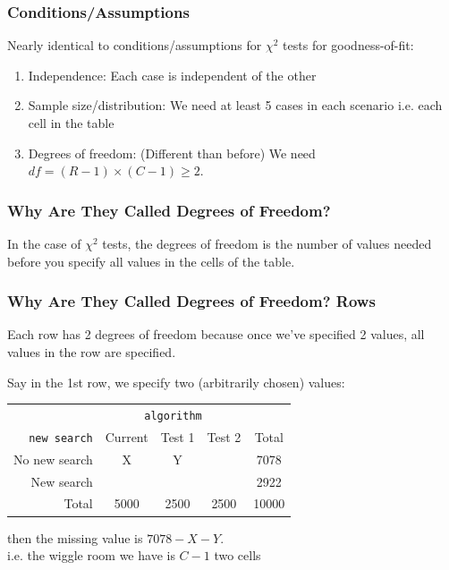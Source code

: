 \documentclass[slides]{beamer}
\newcommand{\blue}[1]{\textcolor{blue2}{#1}}
\begin{document}
\begin{frame}
\frametitle{Conditions/Assumptions}
Nearly identical to conditions/assumptions for $\chi^2$ tests for goodness-of-fit:
\begin{enumerate}
\pause\item \blue{Independence}:  Each case is independent of the other
\pause\item \blue{Sample size/distribution}:  We need at least 5 cases in each scenario i.e. each cell in the table
\pause\item \blue{Degrees of freedom}: (Different than before)  We need $df=(R-1)\times(C-1) \geq 2$.
\end{enumerate}

\end{frame}


\begin{frame}
\frametitle{Why Are They Called Degrees of Freedom?}

In the case of $\chi^2$ tests, the degrees of freedom is the number of values needed before you specify \blue{all} values in the cells of the table.

\end{frame}


\begin{frame}
\frametitle{Why Are They Called Degrees of Freedom? Rows}

Each row has 2 degrees of freedom because once we've specified 2 values, all values in the row are specified.  

\vspace{0.5cm}

\pause
Say in the 1st row, we specify two (arbitrarily chosen) values:  
\begin{center}
  \begin{tabular}{r|ccc|c}
& \multicolumn{3}{c|}{{\tt algorithm}} & \\
       {\tt new search} & Current & Test 1 & Test 2 & Total \\ 
\hline
    No new search & X & Y &  & 7078 \\ 
    New search &  &  &  & 2922 \\ 
\hline
    Total & 5000 & 2500 & 2500 & 10000 \\ 
  \end{tabular}
\end{center}
\pause
then the missing value is $7078-X-Y$.\\ 
i.e. the \blue{wiggle room} we have is $C-1$ two cells

\end{frame}
\end{document}
